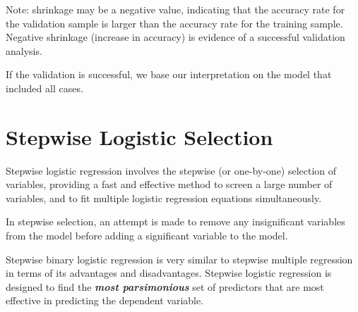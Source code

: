\documentclass[a4paper,12pt]{article}
\begin{document}
Note: shrinkage may be a negative value, indicating that the accuracy rate for the validation sample is larger than the accuracy rate for the training sample. Negative shrinkage (increase in accuracy) is evidence of a successful validation analysis.

If the validation is successful, we base our interpretation on the model that included all cases.

\section*{Stepwise Logistic Selection}
Stepwise logistic regression involves the stepwise (or one-by-one) selection of variables,
providing a fast and effective method to screen a large number of variables, and to fit
multiple logistic regression equations simultaneously.

In stepwise selection, an attempt is made to remove any insignificant variables from the model before adding a significant variable to the model.

Stepwise binary logistic regression is very similar to stepwise multiple regression in terms of its advantages and disadvantages. Stepwise logistic regression is designed to find the \textbf{\textit{most parsimonious}} set of predictors that are most effective in predicting the dependent variable.
\end{document}
